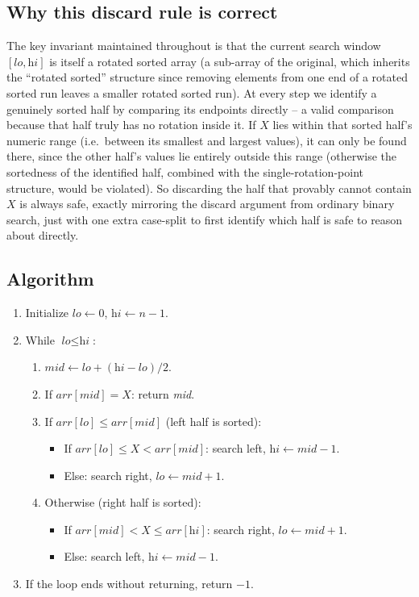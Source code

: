 \subsection*{Why this discard rule is correct}

The key invariant maintained throughout is that the current search window
$[\textit{lo}, \textit{hi}]$ is itself a rotated sorted array (a
sub-array of the original, which inherits the ``rotated sorted'' structure
since removing elements from one end of a rotated sorted run leaves a
smaller rotated sorted run). At every step we identify a genuinely sorted
half by comparing its endpoints directly -- a valid comparison because that
half truly has no rotation inside it. If $X$ lies within that sorted half's
numeric range (i.e.\ between its smallest and largest values), it can only
be found there, since the other half's values lie entirely outside this
range (otherwise the sortedness of the identified half, combined with the
single-rotation-point structure, would be violated). So discarding the
half that provably cannot contain $X$ is always safe, exactly mirroring the
discard argument from ordinary binary search, just with one extra
case-split to first identify which half is safe to reason about directly.

\subsection*{Algorithm}

\begin{enumerate}
  \item Initialize $\textit{lo} \gets 0$, $\textit{hi} \gets n-1$.
  \item While $\textit{lo} \le \textit{hi}$:
  \begin{enumerate}
    \item $\textit{mid} \gets \textit{lo}+(\textit{hi}-\textit{lo})/2$.
    \item If $\textit{arr}[\textit{mid}] = X$: return \textit{mid}.
    \item If $\textit{arr}[\textit{lo}] \le \textit{arr}[\textit{mid}]$
          (left half is sorted):
    \begin{itemize}
      \item If $\textit{arr}[\textit{lo}] \le X < \textit{arr}[\textit{mid}]$:
            search left, $\textit{hi} \gets \textit{mid}-1$.
      \item Else: search right, $\textit{lo} \gets \textit{mid}+1$.
    \end{itemize}
    \item Otherwise (right half is sorted):
    \begin{itemize}
      \item If $\textit{arr}[\textit{mid}] < X \le \textit{arr}[\textit{hi}]$:
            search right, $\textit{lo} \gets \textit{mid}+1$.
      \item Else: search left, $\textit{hi} \gets \textit{mid}-1$.
    \end{itemize}
  \end{enumerate}
  \item If the loop ends without returning, return $-1$.
\end{enumerate}

